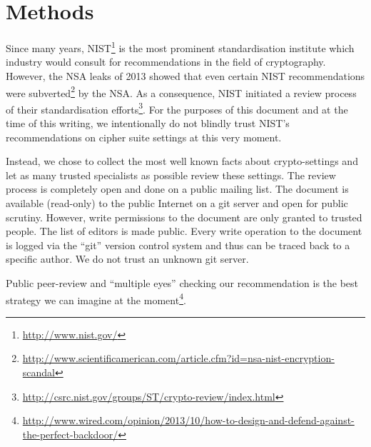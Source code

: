 \section{Methods}

Since many years, NIST\footnote{\url{http://www.nist.gov/}} is the most
prominent standardisation institute which industry would consult for
recommendations in the field of cryptography. However, the NSA leaks of 2013
showed that even certain NIST recommendations were
subverted\footnote{\url{http://www.scientificamerican.com/article.cfm?id=nsa-nist-encryption-scandal}}
by the NSA.  As a consequence, NIST initiated a review process of their
standardisation
efforts\footnote{\url{http://csrc.nist.gov/groups/ST/crypto-review/index.html}}.
For the purposes of this document and at the time of this writing, we
intentionally do not blindly trust NIST's recommendations on cipher suite
settings at this very moment. 

Instead, we chose to collect the most well known facts about crypto-settings
and let as many trusted specialists as possible review these settings.  The
review process is completely open and done on a public mailing list. The
document is available (read-only) to the public Internet on a git server and
open for public scrutiny. However, write permissions to the document are only
granted to trusted people. The list of editors is made public.  Every write
operation to the document is logged via the ``git'' version control system and
thus can be traced back to a specific author.  We do not trust an unknown git
server. 

Public peer-review and  ``multiple eyes'' checking our recommendation is the best
strategy we can imagine at the moment\footnote{\url{http://www.wired.com/opinion/2013/10/how-to-design-and-defend-against-the-perfect-backdoor/}}.

